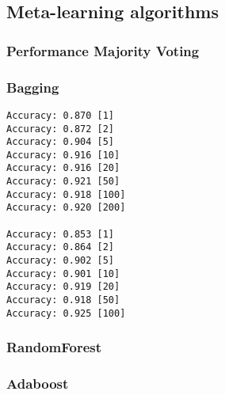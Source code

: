 
\subsection{Meta-learning algorithms}%
\label{sub:meta}

\pagebreak
\subsubsection{Performance Majority Voting}
 
\pagebreak
\subsubsection{Bagging}

\begin{verbatim}
Accuracy: 0.870 [1]
Accuracy: 0.872 [2]
Accuracy: 0.904 [5]
Accuracy: 0.916 [10]
Accuracy: 0.916 [20]
Accuracy: 0.921 [50]
Accuracy: 0.918 [100]
Accuracy: 0.920 [200]

Accuracy: 0.853 [1]
Accuracy: 0.864 [2]
Accuracy: 0.902 [5]
Accuracy: 0.901 [10]
Accuracy: 0.919 [20]
Accuracy: 0.918 [50]
Accuracy: 0.925 [100]
\end{verbatim}
 
\pagebreak
\subsubsection{RandomForest}

 
\pagebreak
\subsubsection{Adaboost}


